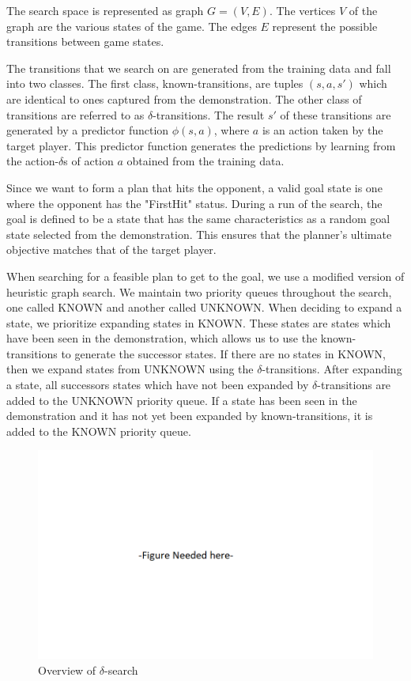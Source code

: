 The search space is represented as graph $G = (V, E)$. The vertices $V$ of the graph are the various states of the game. The edges $E$ represent the possible transitions between game states. 

The transitions that we search on are generated from the training data and fall into two classes. The first class, known-transitions, are tuples $(s,a,s')$ which are identical to ones captured from the demonstration. The other class of transitions are referred to as $\delta$-transitions. The result $s'$ of these transitions are generated by a predictor function $\phi(s, a)$, where $a$ is an action taken by the target player. This predictor function generates the predictions by learning from the action-$\delta$s of action $a$ obtained from the training data.

Since we want to form a plan that hits the opponent, a valid goal state is one where the opponent has the "FirstHit" status. During a run of the search, the goal is defined to be a state that has the same characteristics as a random goal state selected from the demonstration. This ensures that the planner's ultimate objective matches that of the target player.

When searching for a feasible plan to get to the goal, we use a modified version of heuristic graph search. We maintain two priority queues throughout the search, one called KNOWN and another called UNKNOWN. When deciding to expand a state, we prioritize expanding states in KNOWN. These states are states which have been seen in the demonstration, which allows us to use the known-transitions to generate the successor states. If there are no states in KNOWN, then we expand states from UNKNOWN using the $\delta$-transitions. After expanding a state, all successors states which have not been expanded by $\delta$-transitions are added to the UNKNOWN priority queue. If a state has been seen in the demonstration and it has not yet been expanded by known-transitions, it is added to the KNOWN priority queue.

\begin{figure}[t]
	\centering
	\includegraphics[width=\textwidth]{Figures/Placeholder.png}
	\caption{Overview of $\delta$-search}
	\label{}
\end{figure}


